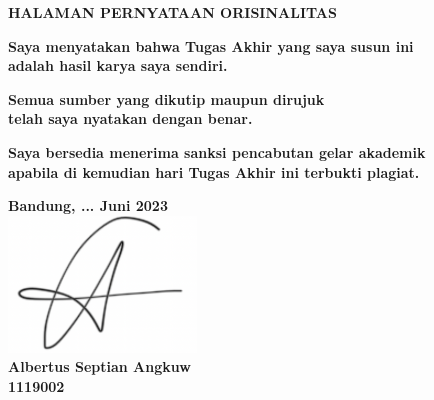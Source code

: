 	\begin{center}
		\vspace*{0cm}
		
		{\large \bfseries HALAMAN PERNYATAAN ORISINALITAS \\}
		
		\vspace{4cm}
			
		\textbf{Saya menyatakan bahwa Tugas Akhir yang saya susun ini \\ adalah hasil karya saya sendiri.}
	
		\textbf{Semua sumber yang dikutip maupun dirujuk \\ telah saya nyatakan dengan benar.}
	
		\textbf{Saya bersedia menerima sanksi pencabutan gelar akademik \\ apabila di kemudian hari Tugas Akhir ini terbukti plagiat.}
			
	
		\vspace*{\fill} 
		\textbf{Bandung, ... Juni 2023} \\
		\includegraphics[width=5cm]{img/sign.png}\\
		\textbf{Albertus Septian Angkuw} \\
		\textbf{1119002}
		\vspace{1cm}
		
	\end{center}